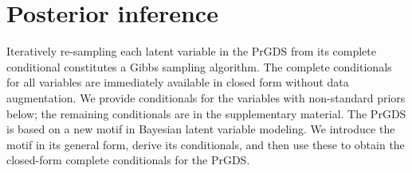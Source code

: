 \documentclass{article}
\begin{document}














\section{Posterior inference}
\label{sec:mcmc}
Iteratively re-sampling each latent variable in the PrGDS from its complete conditional constitutes a Gibbs sampling algorithm. The complete conditionals for all variables are immediately available in closed form without data augmentation. We provide conditionals for the variables with non-standard priors below; the remaining conditionals are in the supplementary material. The PrGDS is based on a new motif in Bayesian latent variable modeling. We introduce the motif in its general form, derive its conditionals, and then use these to obtain the closed-form complete conditionals for the PrGDS.~
\end{document}
